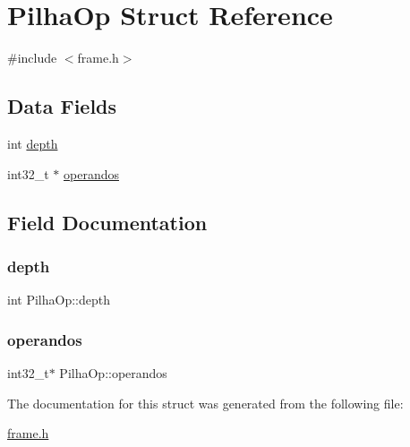 \hypertarget{structPilhaOp}{}\section{Pilha\+Op Struct Reference}
\label{structPilhaOp}


{\ttfamily \#include $<$frame.\+h$>$}

\subsection*{Data Fields}
\begin{DoxyCompactItemize}
\item 
int \hyperlink{structPilhaOp_ad3fdbfc30e2a1b62169ce905a3af6a39}{depth}
\item 
int32\+\_\+t $\ast$ \hyperlink{structPilhaOp_a66868e47a39d4f335823ae7de24947bf}{operandos}
\end{DoxyCompactItemize}


\subsection{Field Documentation}
\mbox{\label{structPilhaOp_ad3fdbfc30e2a1b62169ce905a3af6a39}} 
\subsubsection{\texorpdfstring{depth}{depth}}
{\footnotesize\ttfamily int Pilha\+Op\+::depth}

\mbox{\label{structPilhaOp_a66868e47a39d4f335823ae7de24947bf}} 
\subsubsection{\texorpdfstring{operandos}{operandos}}
{\footnotesize\ttfamily int32\+\_\+t$\ast$ Pilha\+Op\+::operandos}



The documentation for this struct was generated from the following file\+:\begin{DoxyCompactItemize}
\item 
\hyperlink{frame_8h}{frame.\+h}\end{DoxyCompactItemize}
